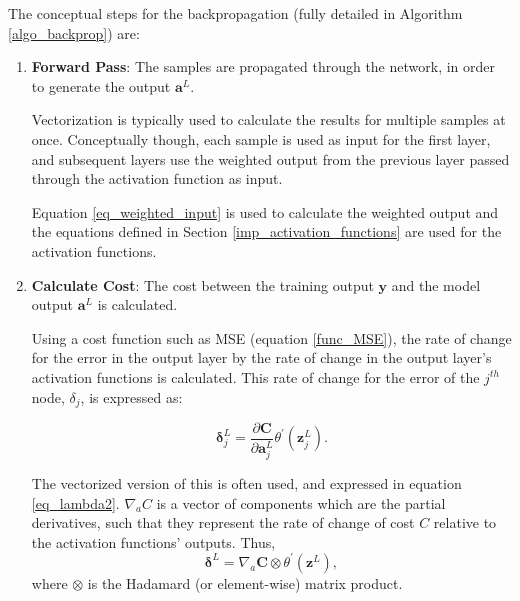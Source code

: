 \documentclass[a4paper,11pt,oneside]{article}
\theoremstyle{plain}
\theoremstyle{definition}
\begin{document}
	The conceptual steps for the backpropagation (fully detailed in Algorithm \ref{algo_backprop}) are: \newline
	\begin{enumerate}
		\item \textbf{Forward Pass}: The samples are propagated through the network, in order to generate the output $\mathbf{a}^L$. \newline 
		
		Vectorization is typically used to calculate the results for multiple samples at once. Conceptually though, each sample is used as input for the first layer, and subsequent layers use the weighted output from the previous layer passed through the activation function as input.\newline 
		
		Equation \ref{eq_weighted_input} is used to calculate the weighted output and the equations defined in Section \ref{imp_activation_functions} are used for the activation functions.
		\newline
		
		\item \textbf{Calculate Cost}: The cost between the training output $\mathbf{y}$ and the model output $\mathbf{a}^L$ is calculated. \newline
		
		Using a cost function such as MSE (equation \eqref{func_MSE}), the rate of change for the error in the output layer by the rate of change in the output layer's activation functions is calculated. This rate of change for the error of the $j^{th}$ node, $\delta_j$, is expressed as:	
		
		\begin{equation}\label{eq_lambda1}
		\mathbf{\delta}_{j}^{L}=\frac{\partial \mathbf{C}}{\partial \mathbf{a}_{j}^{L}} \theta^{\prime}\left(\mathbf{z}_{j}^{L}\right) .
		\end{equation}
		
		The vectorized version of this is often used, and expressed in equation \eqref{eq_lambda2}. $\nabla_a C$ is a vector of components which are the partial derivatives, such that they represent the rate of change of cost $C$ relative to the activation functions' outputs. Thus,
		\begin{equation}\label{eq_lambda2}
		\mathbf{\delta}^{L}=\nabla_a \mathbf{C} \otimes \theta^{\prime}(\mathbf{z}^L), 
		\end{equation}
		where $\otimes$ is the Hadamard (or element-wise) matrix product.\newline
		

\end{enumerate}
\end{document}
